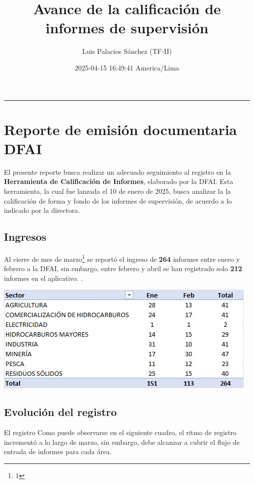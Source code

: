 \documentclass[
]{article}
\title{Avance de la calificación de informes de supervisión}
\author{Luis Palacios Sánchez (TF-II)}
\date{2025-04-15 16:49:41 America/Lima}
\begin{document}
\maketitle

\begin{center}\rule{0.5\linewidth}{0.5pt}\end{center}

\section{Reporte de emisión documentaria
DFAI}\label{reporte-de-emisiuxf3n-documentaria-dfai}

El presente reporte busca realizar un adecuado seguimiento al registro
en la \textbf{Herramienta de Calificación de Informes}, elaborado por la
DFAI. Esta herramienta, la cual fue lanzada el 10 de enero de 2025,
busca analizar la la calificación de forma y fondo de los informes de
supervisión, de acuerdo a lo indicado por la directora.

\subsection{Ingresos}\label{ingresos}

Al cierre de mes de marzo\footnote{1} se reportó el ingreso de
\textbf{264} informes entre enero y febrero a la DFAI, sin embargo,
entre febrero y abril se han registrado solo \textbf{212} informes en el
aplicativo. .

\includegraphics[width=0.8\linewidth]{../../2) INPUT/META MARZO}

\newpage

\subsection{Evolución del registro}\label{evoluciuxf3n-del-registro}

El registro Como puede observarse en el siguiente cuadro, el ritmo de
registro incrementó a lo largo de marzo, sin embargo, debe alcanzar a
cubrir el flujo de entrada de informes para cada área.
\end{document}
